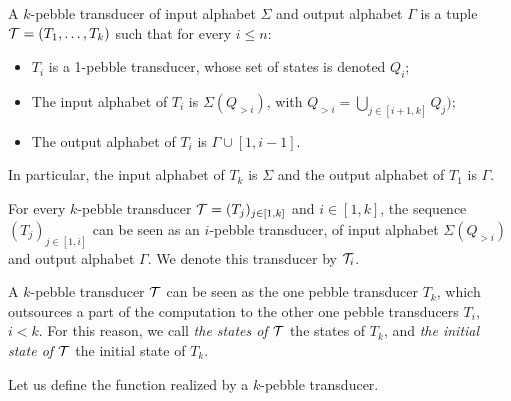 \begin{definition}%
  A $k$-pebble transducer of input alphabet $\Sigma$ and output alphabet $\Gamma$ is a tuple ${\mathcal T}=(T_1,\dots,T_{k})$ such that for every $i\leq n$:
  \begin{itemize}
  \item  $T_i$ is a 1-pebble transducer, whose set of states is denoted $Q_i$;
  \item  The input alphabet of $T_i$ is $\Sigma(Q_{>i})$, with $Q_{>i}=\bigcup_{j\in [i+1,k]}Q_j)$;
  \item  The output alphabet of $T_i$ is $\Gamma \cup [1,i-1]$.
  \end{itemize} 
  In particular, the input alphabet of $T_k$ is $\Sigma$ and the output alphabet of $T_1$ is $\Gamma$.%
  \end{definition}


For every $k$-pebble transducer ${\mathcal T}=(T_j)_{j\in[1,k]}$ and $i\in[1,k]$,  the sequence $(T_j)_{j\in[1,i]}$ can be seen as an $i$-pebble transducer, of input alphabet $\Sigma(Q_{>i})$ and output alphabet $\Gamma$. We denote this transducer by ${\mathcal T}_i$.
 
 \medskip
\begin{terminology} 
 A $k$-pebble transducer ${\mathcal T}$ can be seen as the one pebble transducer $T_k$, which outsources a part of the computation to the other one pebble transducers $T_i$, $i<k$. 
 For this reason, we call \emph{the states of ${\mathcal T}$} the states of $T_k$, and \emph{the initial state of ${\mathcal T}$} the initial state of $T_k$. 
  \end{terminology}
  
  \smallskip
 Let us define the function realized by a $k$-pebble transducer. 
  
